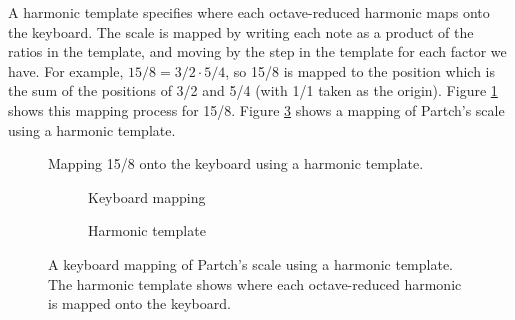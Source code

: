 \documentclass[a4paper,11pt]{article}
\begin{document}
A harmonic template specifies where each octave-reduced harmonic maps onto the
keyboard. The scale is mapped by writing each note as a product of the ratios
in the template, and moving by the step in the template for each factor we
have. For example, $15/8 = 3/2 \cdot 5/4$, so 15/8 is mapped to the position
which is the sum of the positions of 3/2 and 5/4 (with 1/1 taken as the
origin). Figure \ref{fig:harmonic-template-2} shows this mapping process for
15/8. Figure \ref{fig:harmonic-template} shows a mapping of Partch's scale
using a harmonic template.

\begin{figure}

\caption{Mapping 15/8 onto the keyboard using a harmonic template.}
\label{fig:harmonic-template-2}
\end{figure}

\begin{figure}
\begin{subfigure}{\textwidth}

\caption{Keyboard mapping}
\label{fig:harmonic-template-mapping}
\end{subfigure}
\par\bigskip
\par\bigskip
\begin{subfigure}{\textwidth}

\caption{Harmonic template}
\end{subfigure}
\caption{A keyboard mapping of Partch's scale using a harmonic template. The
harmonic template shows where each octave-reduced harmonic is mapped onto the
keyboard.}
\label{fig:harmonic-template}
\end{figure}
\end{document}
